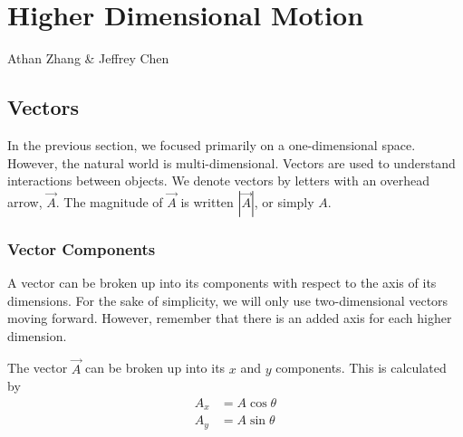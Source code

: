 \documentclass[11pt]{report}
\begin{document}
\chapter{ Higher Dimensional Motion}

Athan Zhang \& Jeffrey Chen

\section{Vectors}

In the previous section, we focused primarily on a one-dimensional space. However, the natural world is multi-dimensional. Vectors are used to understand interactions between objects. We denote vectors by letters with an overhead arrow, $\Vec{A}$. The magnitude of $\Vec{A}$ is written $|\Vec{A}|$, or simply $A$.

\subsection{Vector Components}

A vector can be broken up into its components with respect to the axis of its dimensions. For the sake of simplicity, we will only use two-dimensional vectors moving forward. However, remember that there is an added axis for each higher dimension.

\begin{center}
\end{center}

The vector $\Vec{A}$ can be broken up into its $x$ and $y$ components. This is calculated by 
\begin{align*}
    A_{x} &= A\cos{\theta} \\
    A_{y} &= A\sin{\theta} \\
\end{align*}
\end{document}
